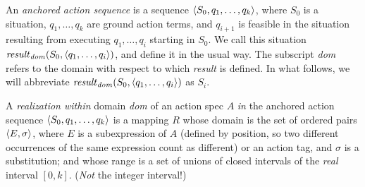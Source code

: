 An {\em anchored action sequence} is a sequence $\langle S_0,
q_1,\ldots,q_k\rangle$, where $S_0$ is a situation, $q_1,\ldots, q_k$ are
ground action terms, and $q_{i+1}$ is feasible in the situation 
resulting from executing $q_1, \ldots, q_i$ starting in $S_0$.
We call this situation
${\it result}_{\it dom}(S_0, \langle q_1, \ldots,q_i\rangle)$,
and define it in the usual way.
The subscript {\it
dom} refers to the domain with respect to which {\it result} is
defined. 
In what
follows, we will abbreviate ${\it result}_{\it dom}(S_0, \langle q_1, \ldots,q_i\rangle)$
as  $S_i$.

A {\em realization within} domain {\it dom} of an action spec $A$ {\em
in} 
the anchored action 
sequence $\langle S_0,q_1,\ldots,q_k\rangle$ 
is a mapping $R$ whose
domain is the set of ordered pairs $\langle E,\sigma\rangle$, where $E$ is a
subexpression of $A$ (defined by position, so two different
occurrences of the same expression count as different) or an action
tag, and $\sigma$ is
a substitution; and whose range is a set of unions of closed
intervals of the {\em real} interval $[0,k]$.  ({\em Not} the integer
interval!)

